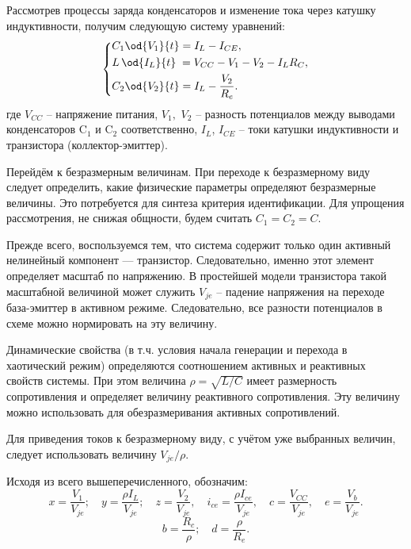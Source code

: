 Рассмотрев процессы заряда конденсаторов и изменение тока через
катушку индуктивности, получим следующую систему уравнений:
%
\begin{equation}
\label{atu:eq:colp_phys}
\begin{dcases}
  C_1 \od{V_{1}}{t}  = I_L - I_{CE} , \\
  L\, \od{I_L}{t} \; = V_{CC} - V_{1} - V_{2} - I_L R_C , \\
  C_2 \od{V_{2}}{t}  = I_L - \frac{V_{2}}{R_e}.
\end{dcases}
\end{equation}
%
%
где
$V_{CC} $ -- напряжение питания,
$V_1,$ $V_2$ -- разность потенциалов между выводами конденсаторов
$\mathrm{C}_1$ и $\mathrm{C}_2$ соответственно,
$I_L$, $I_{CE}$ -- токи катушки индуктивности и транзистора (коллектор-эмиттер).

Перейдём к безразмерным величинам.
При переходе к безразмерному виду следует определить,
какие физические параметры определяют безразмерные величины.
Это потребуется для синтеза критерия идентификации.
Для упрощения рассмотрения, не снижая общности,
будем считать $C_1 = C_2 = C$.

Прежде всего, воспользуемся тем, что система содержит только один
активный нелинейный компонент --- транзистор.
Следовательно, именно этот элемент определяет
масштаб по напряжению. В простейшей модели транзистора
такой масштабной величиной может служить
$V_{je}$ -- падение напряжения на переходе база-эмиттер
в активном режиме. Следовательно, все разности потенциалов в схеме можно нормировать
на эту величину.

Динамические свойства (в т.ч. условия начала генерации и перехода в хаотический режим) определяются
соотношением активных и реактивных свойств системы. При этом величина
$ \rho = \sqrt{L/C} $ имеет размерность сопротивления
и определяет величину реактивного сопротивления. Эту величину можно использовать
для обезразмеривания активных сопротивлений.

Для приведения токов к безразмерному виду, с учётом уже выбранных величин,
следует использовать величину $ V_{je} / \rho$.


Исходя из всего вышеперечисленного, обозначим:
%
\[
  x = \frac{V_{1}}{V_{je}} ; \quad
  y = \frac{\rho I_L}{V_{je}} ; \quad
  z = \frac{V_{2}}{V_{je}}, \quad
  i_{ce} = \frac{\rho I_{ce}}{V_{je}}, \quad
  c = \frac{V_{CC}}{V_{je}}, \quad
  e = \frac{V_{b}}{V_{je}}.
\]
%
\[
  b = \frac{R_c}{\rho}; \quad
  d = \frac{\rho}{R_e}. %
\]


